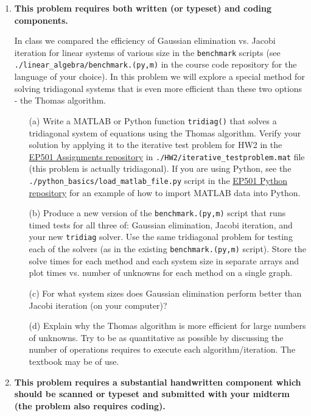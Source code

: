 \documentclass{article}
\begin{document}
\begin{enumerate}

  
  \item \textbf{This problem requires both written (or typeset) and coding components.}  
  
  In class we compared the efficiency of Gaussian elimination vs. Jacobi iteration for linear systems of various size in the \texttt{benchmark} scripts (see \texttt{./linear\_algebra/benchmark.(py,m)} in the course code repository for the language of your choice).  In this problem we will explore a special method for solving tridiagonal systems that is even more efficient than these two options - the Thomas algorithm.  
  \begin{enumerate}
     \item[(a)]  Write a MATLAB or Python function \texttt{tridiag()} that solves a tridiagonal system of equations using the Thomas algorithm.  Verify your solution by applying it to the iterative test problem for HW2 in the \href{https://github.com/Zettergren-Courses/EP501_assignments}{EP501 Assignments repository} in \texttt{./HW2/iterative\_testproblem.mat} file (this problem is actually tridiagonal).  If you are using Python, see the \texttt{./python\_basics/load\_matlab\_file.py} script in the \href{https://github.com/Zettergren-Courses/EP501_python}{EP501 Python repository} for an example of how to import MATLAB data into Python.  
     \item[(b)]  Produce a new version of the \texttt{benchmark.(py,m)} script that runs timed tests for all three of:   Gaussian elimination, Jacobi iteration, and your new \texttt{tridiag} solver.  Use the same tridiagonal problem for testing each of the solvers (as in the existing \texttt{benchmark.(py,m)} script).  Store the solve times for each method and each system size in separate arrays and plot times vs. number of unknowns for each method on a single graph.  
     \item[(c)]  For what system sizes does Gaussian elimination perform better than Jacobi iteration (on your computer)?
     \item[(d)]  Explain why the Thomas algorithm is more efficient for large numbers of unknowns.  Try to be as quantitative as possible by discussing the number of operations requires to execute each algorithm/iteration.  The textbook may be of use.  
  \end{enumerate}
  
  \item \textbf{This problem requires a substantial handwritten component which should be scanned or typeset and submitted with your midterm (the problem also requires coding).} 
  

\end{enumerate}
\end{document}
